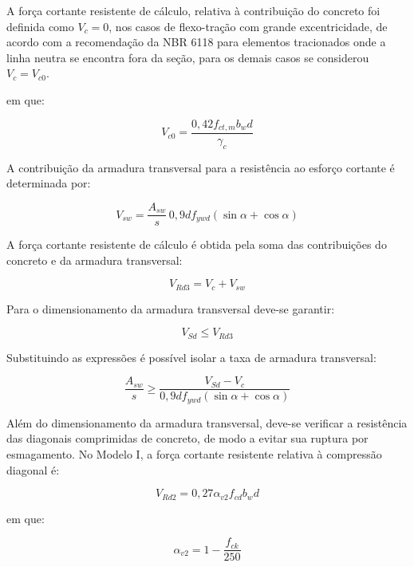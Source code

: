 A força cortante resistente de cálculo, relativa à contribuição do concreto foi definida como $V_c = 0$, nos casos de flexo-tração com grande excentricidade, de acordo com a recomendação da NBR 6118  para elementos tracionados onde a linha neutra se encontra fora da seção, para os demais casos se considerou $V_c = V_{c0}$.

em que:

\begin{equation}
V_{c0} = \frac{0,42f_{ct,m}b_wd}{\gamma_c}
\end{equation}

A contribuição da armadura transversal para a resistência ao esforço cortante é determinada por:

\begin{equation}
V_{sw} =
\frac{A_{sw}}{s}\,0,9d f_{ywd}
(\sin\alpha+\cos\alpha)
\end{equation}

A força cortante resistente de cálculo é obtida pela soma das contribuições do concreto e da armadura transversal:

\begin{equation}
V_{Rd3} = V_c + V_{sw}
\end{equation}

Para o dimensionamento da armadura transversal deve-se garantir:

\begin{equation}
V_{Sd} \leq V_{Rd3}
\end{equation}

Substituindo as expressões é possível isolar a taxa de armadura transversal:

\begin{equation}
\frac{A_{sw}}{s} \geq
\frac{V_{Sd}-V_{c}}
{0,9d f_{ywd}(\sin\alpha+\cos\alpha)}
\end{equation}

Além do dimensionamento da armadura transversal, deve-se verificar a resistência das diagonais comprimidas de concreto, de modo a evitar sua ruptura por esmagamento. No Modelo I, a força cortante resistente relativa à compressão diagonal é:

\begin{equation}
V_{Rd2} =
0,27\alpha_{v2}f_{cd}b_wd
\end{equation}

em que:

\begin{equation}
\alpha_{v2} = 1-\frac{f_{ck}}{250}
\end{equation}

